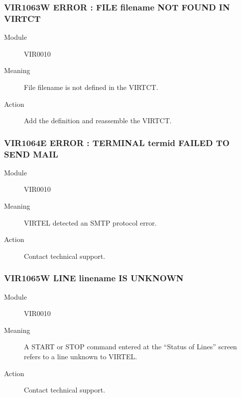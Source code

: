 \documentclass[letterpaper,10pt,english]{sphinxmanual}
\begin{document}
\subsubsection{VIR1063W ERROR : FILE filename NOT FOUND IN VIRTCT}
\label{\detokenize{messages:vir1063w-error-file-filename-not-found-in-virtct}}\begin{description}
\item[{Module}] \leavevmode
VIR0010

\item[{Meaning}] \leavevmode
File filename is not defined in the VIRTCT.

\item[{Action}] \leavevmode
Add the definition and reassemble the VIRTCT.

\end{description}


\subsubsection{VIR1064E ERROR : TERMINAL termid FAILED TO SEND MAIL}
\label{\detokenize{messages:vir1064e-error-terminal-termid-failed-to-send-mail}}\begin{description}
\item[{Module}] \leavevmode
VIR0010

\item[{Meaning}] \leavevmode
VIRTEL detected an SMTP protocol error.

\item[{Action}] \leavevmode
Contact technical support.

\end{description}


\subsubsection{VIR1065W LINE linename IS UNKNOWN}
\label{\detokenize{messages:vir1065w-line-linename-is-unknown}}\begin{description}
\item[{Module}] \leavevmode
VIR0010

\item[{Meaning}] \leavevmode
A START or STOP command entered at the “Status of Lines” screen refers to a line unknown to VIRTEL.

\item[{Action}] \leavevmode
Contact technical support.

\end{description}
\end{document}
